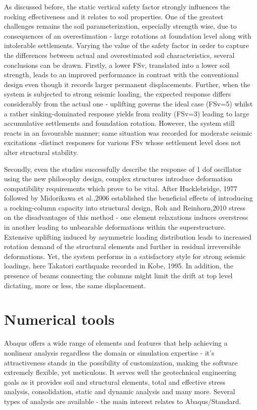 \documentclass[12pt,a4paper]{report}
\begin{document}
As discussed before, the static vertical safety factor strongly influences the rocking effectiveness and it relates to soil properties. One of the greatest challenges remains the soil parameterization, especially strength wise, due to consequences of an overestimation - large rotations at foundation level along with intolerable settlements. Varying the value of the safety factor in order to capture the differences between actual and overestimated soil characteristics, several conclusions can be drawn. Firstly, a lower FSv, translated into a lower soil strength, leads to an improved performance in contrast with the conventional design even though it records larger permanent displacements. Further, when the system is subjected to strong seismic loading, the expected response differs considerably from the actual one - uplifting governs the ideal case (FSv=5) whilst a rather sinking-dominated response yields from reality (FSv=3) leading to large accumulative settlements and foundation rotation. However, the system still reacts in an favourable manner; same situation was recorded for moderate seismic excitations -distinct responses for various FSv whose settlement level does not alter structural stability. 

Secondly, even the studies successfully describe the response of 1 dof oscillator using the new philosophy design, complex structures introduce deformation compatibility requirements which prove to be vital. After Hucklebridge, 1977 \cite{huckelbridge1978seismic} followed by Midorikawa et al.,2006 \cite{kanno2006new} established the beneficial effects of introducing a rocking-column capacity into structural design, Roh and Reinhorn,2010 \cite{roh2010modeling} stress on the disadvantages of this method - one element relaxations induces overstress in another leading to unbearable deformations within the superstructure. Extensive uplifting induced by asymmetric loading distribution leads to increased rotation demand of the structural elements and further in residual irreversible deformations. Yet, the system performs in a satisfactory style for strong seismic loadings, here Takatori earthquake recorded in Kobe, 1995. In addition, the presence of beams connecting the columns might limit the drift at top level dictating, more or less, the same displacement.


\section{Numerical tools}
Abaqus \cite{hibbett1998abaqus} offers a wide range of elements and features that help achieving a nonlinear analysis regardless the domain or simulation expertise - it's attractiveness stands in the possibility of customization, making the software extremely flexible, yet meticulous. It serves well the geotechnical engineering goals as it provides soil and structural elements, total and effective stress analysis, consolidation, static and dynamic analysis and many more. Several types of analysis are available - the main interest relates to Abaqus/Standard.
\end{document}
